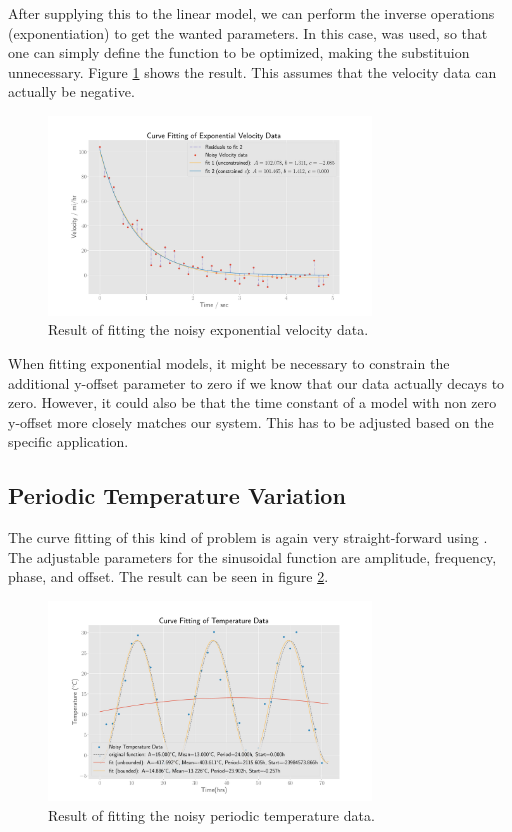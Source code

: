 \documentclass[10pt, a4paper]{article}
\begin{document}
After supplying this to the linear model, we can perform the inverse operations (exponentiation) to get the wanted parameters. In this case,  was used, so that one can simply define the function to be optimized, making the substituion unnecessary. Figure \ref{fig:expo} shows the result. This assumes that the velocity data can actually be negative.\\

\begin{figure}[h]
  \centering
  \includegraphics[width=0.764\textwidth]{graphics/exp_fit.pdf}
  \caption{Result of fitting the noisy exponential velocity data.}\label{fig:expo}
\end{figure}


When fitting exponential models, it might be necessary to constrain the additional y-offset parameter to zero if we know that our data actually decays to zero. However, it could also be that the time constant of a model with non zero y-offset more closely matches our system. This has to be adjusted based on the specific application.

\subsection{Periodic Temperature Variation}
The curve fitting of this kind of problem is again very straight-forward using .
The adjustable parameters for the sinusoidal function are amplitude, frequency, phase, and offset. The result can be seen in figure \ref{fig:sin}.\\

\begin{figure}[h]
  \centering
  \includegraphics[width=0.764\textwidth]{graphics/sin_fit.pdf}
  \caption{Result of fitting the noisy periodic temperature data.}\label{fig:sin}
\end{figure}
\end{document}
